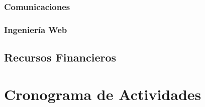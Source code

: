 \subsubsection*{Comunicaciones}

\subsubsection*{Ingenier\'ia Web}


\subsection{Recursos Financieros} 
\section{Cronograma de Actividades}
